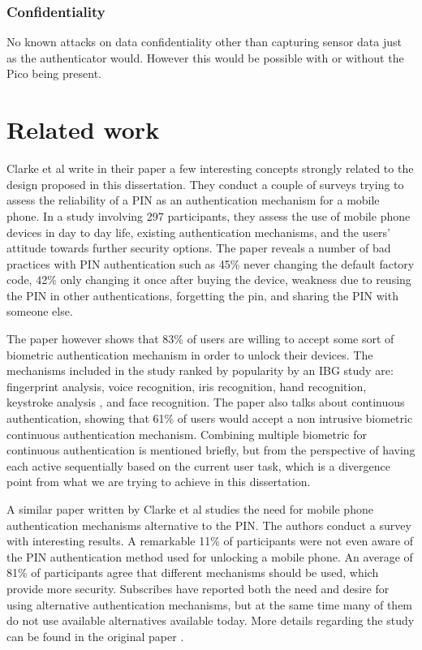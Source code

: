 	\subsubsection*{Confidentiality}
	No known attacks on data confidentiality other than capturing sensor data just as the authenticator would. However this would be possible with or without the Pico being present.

\section{Related work}
Clarke et al write in their paper \cite{clarke2005authentication} a few interesting concepts strongly related to the design proposed in this dissertation. They conduct a couple of surveys trying to assess the reliability of a PIN as an authentication mechanism for a mobile phone. In a study involving 297 participants, they assess the use of mobile phone devices in day to day life, existing authentication mechanisms, and the users' attitude towards further security options. The paper reveals a number of bad practices with PIN authentication such as 45\% never changing the default factory code, 42\% only changing it once after buying the device, weakness due to reusing the PIN in other authentications, forgetting the pin, and sharing the PIN with someone else.

The paper \cite{clarke2005authentication} however shows that 83\% of users are willing to accept some sort of biometric authentication mechanism in order to unlock their devices. The mechanisms included in the study ranked by popularity by an IBG study \cite{} are: fingerprint analysis, voice recognition, iris recognition, hand recognition, keystroke analysis \cite{clarke2003using}, and face recognition. The paper also talks about continuous authentication, showing that 61\% of users would accept a non intrusive biometric continuous authentication mechanism. Combining multiple biometric for continuous authentication is mentioned briefly, but from the perspective of having each active sequentially based on the current user task, which is a divergence point from what we are trying to achieve in this dissertation.

A similar paper \cite{clarke2002acceptance} written by Clarke et al studies the need for mobile phone authentication mechanisms alternative to the PIN. The authors conduct a survey with interesting results. A remarkable 11\% of participants were not even aware of the PIN authentication method used for unlocking a mobile phone. An average of 81\% of participants agree that different mechanisms should be used, which provide more security. Subscribes have reported both the need and desire for using alternative authentication mechanisms, but at the same time many of them do not use available alternatives available today. More details regarding the study can be found in the original paper \cite{clarke2002acceptance}.

